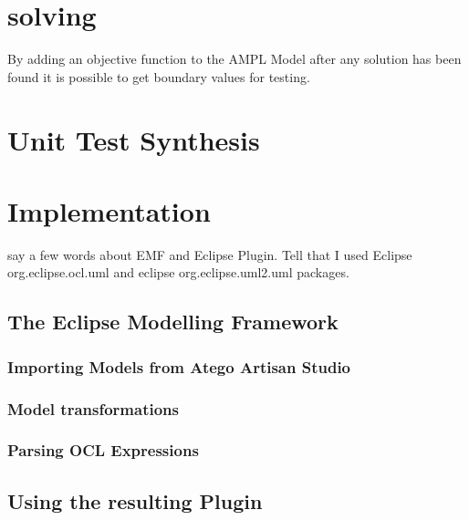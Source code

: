\section{solving}
\label{sec:testgenerationSolving}
By adding an objective function to the AMPL Model after any solution has been found it is possible to get boundary values for testing.

\section{Unit Test Synthesis}
\label{sec:testgenerationUnitTestSynthesis}

\section{Implementation}
\label{sec:testgenerationImplementation}
say a few words about EMF and Eclipse Plugin. Tell that I used Eclipse org.eclipse.ocl.uml and eclipse org.eclipse.uml2.uml packages. 
\subsection{The Eclipse Modelling Framework}
\cite{EMF}
\subsubsection{Importing Models from Atego Artisan Studio}
\subsubsection{Model transformations}
\subsubsection{Parsing OCL Expressions}
\subsection{Using the resulting Plugin}
